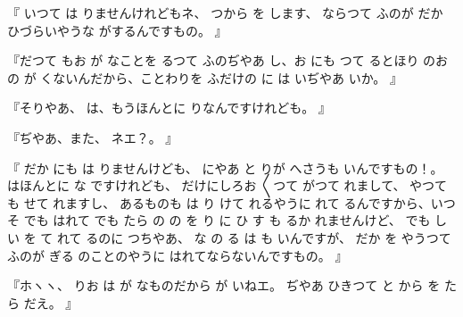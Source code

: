 『
いつて
は
りませんけれどもネ、
つから
を
します、
ならつて
ふのが
だか
ひづらいやうな
がするんですもの。
』

『だつて
もお
が
なことを
るつて
ふのぢやあ
し、お
にも
つて
るとほり
のお
の
が
くないんだから、ことわりを
ふだけの
に
は
いぢやあ
いか。
』

『そりやあ、
は、もうほんとに
りなんですけれども。
』

『ぢやあ、また、
ネエ？。
』

『
だか
にも
は
りませんけども、
にやあ
と
りが
へさうも
いんですもの！。
はほんとに
な
ですけれども、
だけにしろお
〳〵つて
がつて
れまして、
やつて
も
せて
れますし、
あるものも
は
り
けて
れるやうに
れて
るんですから、いつそ
でも
はれて
でも
たら
の
の
を
り
に
ひ
す
も
るか
れませんけど、
でも
しい
を
て
れて
るのに
つちやあ、
な
の
る
は
も
いんですが、
だか
を
やうつて
ふのが
ぎる
のことのやうに
はれてならないんですもの。
』

『ホヽヽ、
りお
は
が
なものだから
が
いねエ。
ぢやあ
ひきつて
と
から
を
たら
だえ。
』

